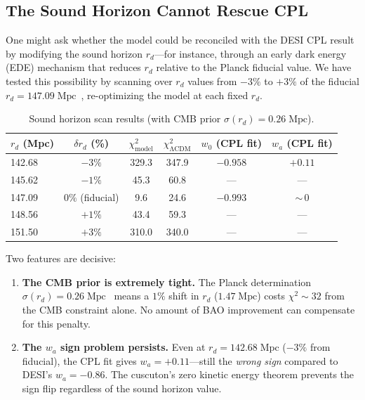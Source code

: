 \subsection{The Sound Horizon Cannot Rescue CPL}
\label{sec:2-CPL-rd}

One might ask whether the model could be reconciled with the DESI CPL result by modifying the sound horizon $r_d$---for instance, through an early dark energy (EDE) mechanism that reduces $r_d$ relative to the Planck fiducial value. We have tested this possibility by scanning over $r_d$ values from $-3\%$ to $+3\%$ of the fiducial $r_d = 147.09\;\mathrm{Mpc}$~\cite{ch2:Planck2018}, re-optimizing the model at each fixed $r_d$.

\begin{table}[htbp]
\centering
\caption{Sound horizon scan results (with CMB prior $\sigma(r_d) = 0.26\;\mathrm{Mpc}$).}
\label{tab:2-rd}
\begin{tabular}{lccccc}
\toprule
$r_d$ (Mpc) & $\delta r_d$ (\%) & $\chi^2_\mathrm{model}$ & $\chi^2_\mathrm{\Lambda CDM}$ & $w_0$ (CPL fit) & $w_a$ (CPL fit) \\
\midrule
142.68 & $-3\%$ & 329.3 & 347.9 & $-0.958$ & $+0.11$ \\
145.62 & $-1\%$ &  45.3 &  60.8 & --- & --- \\
147.09 & $0\%$ (fiducial) &   9.6 &  24.6 & $-0.993$ & ${\sim}\,0$ \\
148.56 & $+1\%$ &  43.4 &  59.3 & --- & --- \\
151.50 & $+3\%$ & 310.0 & 340.0 & --- & --- \\
\bottomrule
\end{tabular}
\end{table}

Two features are decisive:
\begin{enumerate}
    \item \textbf{The CMB prior is extremely tight.} The Planck determination $\sigma(r_d) = 0.26\;\mathrm{Mpc}$~\cite{ch2:Planck2018} means a $1\%$ shift in $r_d$ ($1.47\;\mathrm{Mpc}$) costs $\chi^2 \sim 32$ from the CMB constraint alone. No amount of BAO improvement can compensate for this penalty.

    \item \textbf{The $w_a$ sign problem persists.} Even at $r_d = 142.68\;\mathrm{Mpc}$ ($-3\%$ from fiducial), the CPL fit gives $w_a = +0.11$---still the \emph{wrong sign} compared to DESI's $w_a = -0.86$. The cuscuton's zero kinetic energy theorem prevents the sign flip regardless of the sound horizon value.
\end{enumerate}

